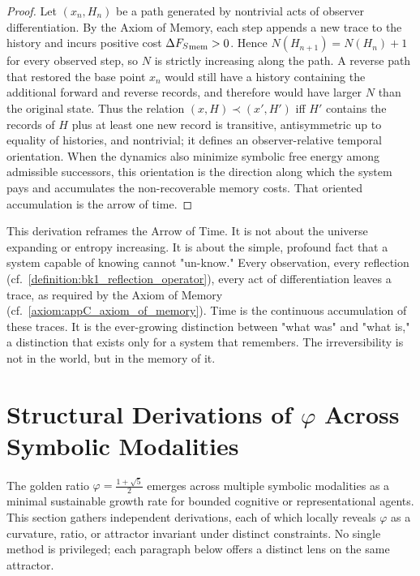 \begin{proof}
\label{proof:appC_emergence_of_time_arrow_final}
Let $(x_n,H_n)$ be a path generated by nontrivial acts of observer
differentiation. By the Axiom of Memory, each step appends a new trace to the
history and incurs positive cost $\Delta{F_S}_{\text{mem}}>0$. Hence
$N(H_{n+1})=N(H_n)+1$ for every observed step, so $N$ is strictly increasing along
the path. A reverse path that restored the base point $x_n$ would still have a
history containing the additional forward and reverse records, and therefore
would have larger $N$ than the original state. Thus the relation
$(x,H)\prec(x',H')$ iff $H'$ contains the records of $H$ plus at least one new
record is transitive, antisymmetric up to equality of histories, and nontrivial;
it defines an observer-relative temporal orientation. When the dynamics also
minimize symbolic free energy among admissible successors, this orientation is
the direction along which the system pays and accumulates the non-recoverable
memory costs. That oriented accumulation is the arrow of time.
\end{proof}

\begin{scholium}
\label{scholium:appC_time_as_memory}
This derivation reframes the Arrow of Time. It is not about the universe expanding or entropy increasing. It is about the simple, profound fact that a system capable of knowing cannot "un-know." Every observation, every reflection (cf.~\ref{definition:bk1_reflection_operator}), every act of differentiation leaves a trace, as required by the Axiom of Memory (cf.~\ref{axiom:appC_axiom_of_memory}). Time is the continuous accumulation of these traces. It is the ever-growing distinction between "what was" and "what is," a distinction that exists only for a system that remembers. The irreversibility is not in the world, but in the memory of it.
\end{scholium}

\section{\texorpdfstring{Structural Derivations of $\varphi$ Across Symbolic Modalities}{Structural Derivations of phi Across Symbolic Modalities}}
\label{sec:appC_phi_geometry_theorem}

\begin{tcolorbox}[colback=blue!3!white,colframe=blue!40!black,title={Symbolic Attractor Statement}]
The golden ratio $\varphi = \frac{1 + \sqrt{5}}{2}$ emerges across multiple symbolic modalities as a minimal sustainable growth rate for bounded cognitive or representational agents. This section gathers independent derivations, each of which locally reveals $\varphi$ as a curvature, ratio, or attractor invariant under distinct constraints. No single method is privileged; each paragraph below offers a distinct lens on the same attractor.
\end{tcolorbox}

